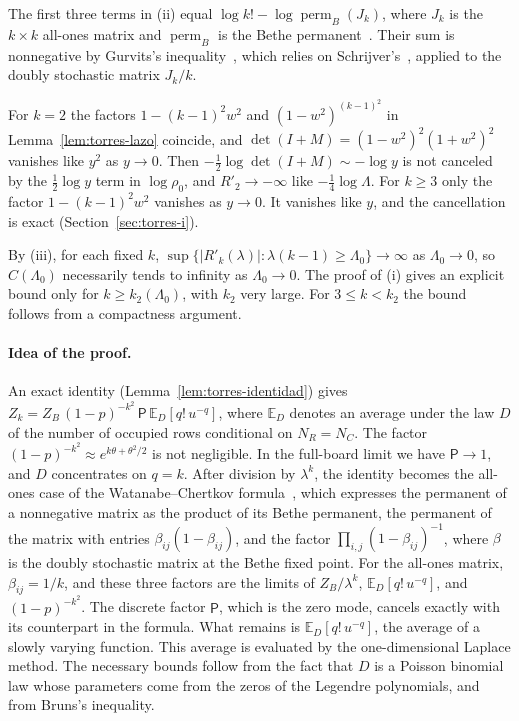 The first three terms in (ii) equal $\log k!-\log\operatorname{perm}_B(J_k)$, where $J_k$ is the
$k\times k$ all-ones matrix and $\operatorname{perm}_B$ is the Bethe permanent~\cite{Vontobel}. Their sum is
nonnegative by Gurvits's inequality~\cite{Gurvits}, which relies on Schrijver's~\cite{Schrijver}, applied
to the doubly stochastic matrix $J_k/k$.

\begin{observacion}
For $k=2$ the factors $1-(k-1)^2w^2$ and $(1-w^2)^{(k-1)^2}$ in Lemma~\ref{lem:torres-lazo} coincide, and
$\det(I+M)=(1-w^2)^2(1+w^2)^2$ vanishes like $y^2$ as $y\to0$. Then
$-\frac12\log\det(I+M)\sim-\log y$ is not canceled by the $\frac12\log y$ term in $\log\rho_0$, and
$R'_2\to-\infty$
like $-\frac14\log\Lambda$. For $k\ge3$ only the factor $1-(k-1)^2w^2$ vanishes as $y\to0$. It vanishes
like $y$, and the cancellation is exact (Section~\ref{sec:torres-i}).
\end{observacion}

\begin{observacion}
By (iii), for each fixed $k$, $\sup\{|R'_k(\lambda)|:\lambda(k-1)\ge\Lambda_0\}\to\infty$ as
$\Lambda_0\to0$, so $C(\Lambda_0)$ necessarily tends to infinity as $\Lambda_0\to0$. The proof of (i) gives
an
explicit bound only for $k\ge k_2(\Lambda_0)$, with $k_2$ very large. For $3\le k<k_2$ the bound follows
from a
compactness argument.
\end{observacion}

\paragraph{Idea of the proof.}
An exact identity (Lemma~\ref{lem:torres-identidad}) gives
$Z_k=Z_B\,(1-p)^{-k^2}\,\mathsf P\,\mathbb E_D[q!\,u^{-q}]$, where $\mathbb E_D$ denotes an average under
the law
$D$ of the number of occupied rows conditional on $N_R=N_C$. The factor
$(1-p)^{-k^2}\approx e^{k\theta+\theta^2/2}$ is not negligible. In the full-board limit we
have $\mathsf P\to1$, and $D$ concentrates on $q=k$. After division by $\lambda^k$, the identity becomes
the all-ones case of the Watanabe--Chertkov formula~\cite{WC}, which expresses
the permanent of a nonnegative matrix as the product of its Bethe permanent, the permanent of
the matrix with entries $\beta_{ij}(1-\beta_{ij})$, and the factor $\prod_{i,j}(1-\beta_{ij})^{-1}$, where
$\beta$ is the doubly stochastic matrix at the Bethe fixed point. For the all-ones matrix,
$\beta_{ij}=1/k$, and these three factors are the limits of $Z_B/\lambda^k$,
$\mathbb E_D[q!\,u^{-q}]$, and $(1-p)^{-k^2}$. The discrete factor $\mathsf P$, which is the
zero mode, cancels exactly with its counterpart in the formula. What remains is $\mathbb E_D[q!\,u^{-q}]$,
the average of a
slowly varying function. This average is evaluated by the one-dimensional Laplace method. The necessary
bounds follow from the fact that $D$ is a Poisson binomial law whose parameters come from the zeros of the
Legendre polynomials, and from Bruns's inequality.
